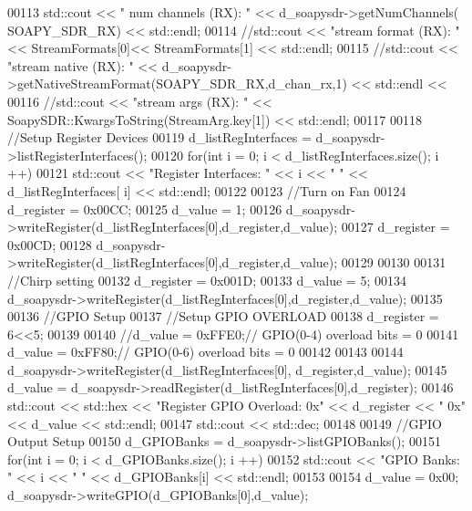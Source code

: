 \begin{DoxyCode}
00113       std::cout << \textcolor{stringliteral}{" num channels (RX): "} << d_soapysdr->getNumChannels(
      SOAPY_SDR_RX) << std::endl;
00114       \textcolor{comment}{//std::cout << "stream format (RX): " << StreamFormats[0]<< StreamFormats[1] << std::endl;}
00115       \textcolor{comment}{//std::cout << "stream native (RX): " << d\_soapysdr->getNativeStreamFormat(SOAPY\_SDR\_RX,d\_chan\_rx,1)
       << std::endl <<}
00116       \textcolor{comment}{//std::cout << "stream args (RX): " << SoapySDR::KwargsToString(StreamArg.key[1]) << std::endl;}
00117 
00118       \textcolor{comment}{//Setup Register Devices}
00119       d_listRegInterfaces = d_soapysdr->listRegisterInterfaces();
00120       \textcolor{keywordflow}{for}(\textcolor{keywordtype}{int} i = 0; i < d_listRegInterfaces.size(); i ++)
00121         std::cout << \textcolor{stringliteral}{"Register Interfaces: "} << i << \textcolor{stringliteral}{" "} << d_listRegInterfaces[
      i] << std::endl;
00122 
00123       \textcolor{comment}{//Turn on Fan}
00124       d_register = 0x00CC;
00125       d_value = 1;
00126       d_soapysdr->writeRegister(d_listRegInterfaces[0],d_register,d_value);
00127       d_register = 0x00CD;
00128       d_soapysdr->writeRegister(d_listRegInterfaces[0],d_register,d_value);
00129 
00130 
00131       \textcolor{comment}{//Chirp setting}
00132       d_register = 0x001D;
00133       d_value = 5;
00134       d_soapysdr->writeRegister(d_listRegInterfaces[0],d_register,d_value);
00135 
00136       \textcolor{comment}{//GPIO Setup}
00137       \textcolor{comment}{//Setup GPIO OVERLOAD}
00138       d_register = 6<<5;
00139 
00140       \textcolor{comment}{//d\_value = 0xFFE0;// GPIO(0-4) overload bits = 0}
00141       d_value = 0xFF80;\textcolor{comment}{// GPIO(0-6) overload bits = 0}
00142 
00143 
00144       d_soapysdr->writeRegister(d_listRegInterfaces[0], d_register,d_value);
00145       d_value = d_soapysdr->readRegister(d_listRegInterfaces[0],d_register);
00146       std::cout << std::hex << \textcolor{stringliteral}{"Register GPIO Overload: 0x"}  << d_register << \textcolor{stringliteral}{" 0x"}  <<  
      d_value << std::endl;
00147       std::cout << std::dec;
00148 
00149       \textcolor{comment}{//GPIO Output Setup}
00150       d_GPIOBanks = d_soapysdr->listGPIOBanks();
00151       \textcolor{keywordflow}{for}(\textcolor{keywordtype}{int} i = 0; i < d_GPIOBanks.size(); i ++)
00152         std::cout << \textcolor{stringliteral}{"GPIO Banks: "} << i << \textcolor{stringliteral}{" "} << d_GPIOBanks[i] << std::endl;
00153 
00154       d_value = 0x00; d_soapysdr->writeGPIO(d_GPIOBanks[0],d_value);

\end{DoxyCode}
